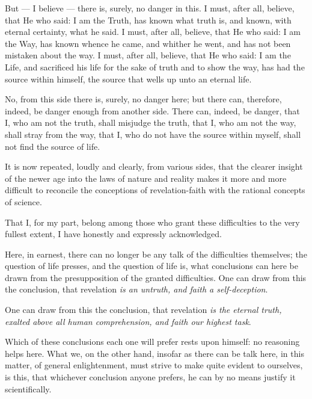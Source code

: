 \documentclass[12pt,a4paper]{book}
\begin{document}
But --- I believe --- there is, surely, no danger in this. I must, after all, believe, that He who said: I am the Truth, has known what truth is, and known, with eternal certainty, what he said. I must, after all, believe, that He who said: I am the Way, has known whence he came, and whither he went, and has not been mistaken about the way. I must, after all, believe, that He who said: I am the Life, and sacrificed his life for the sake of truth and to show the way, has had the source within himself, the source that wells up unto an eternal life.

No, from this side there is, surely, no danger here; but there can, therefore, indeed, be danger enough from another side. There can, indeed, be danger, that I, who am not the truth, shall misjudge the truth, that I, who am not the way, shall stray from the way, that I, who do not have the source within myself, shall not find the source of life.

It is now repeated, loudly and clearly, from various sides, that the clearer insight of the newer age into the laws of nature and reality makes it more and more difficult to reconcile the conceptions of revelation-faith with the rational concepts of science.

That I, for my part, belong among those who grant these difficulties to the very fullest extent, I have honestly and expressly acknowledged.

Here, in earnest, there can no longer be any talk of the difficulties themselves; the question of life presses, and the question of life is, what conclusions can here be drawn from the presupposition of the granted difficulties.
One can draw from this the conclusion, that revelation \emph{is an untruth, and faith a self-deception}.

One can draw from this the conclusion, that revelation \emph{is the eternal truth, exalted above all human comprehension, and faith our highest task}.

Which of these conclusions each one will prefer rests upon himself: no reasoning helps here. What we, on the other hand, insofar as there can be talk here, in this matter, of general enlightenment, must strive to make quite evident to ourselves, is this, that whichever conclusion anyone prefers, he can by no means justify it scientifically.
\end{document}
